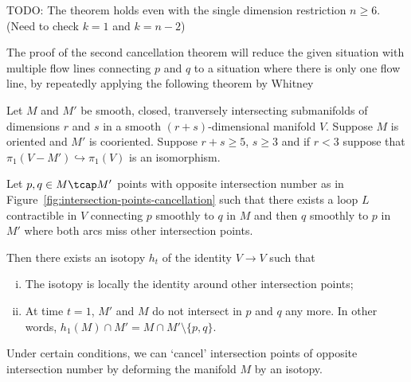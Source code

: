 \begin{remark}
    TODO: The theorem holds even with the single dimension restriction $ n \ge  6$. (Need to check $k = 1$ and $k = n-2$)
\end{remark}

The proof of the second cancellation theorem will reduce the given situation with multiple flow lines connecting $p$ and  $q$ to a situation where there is only one flow line, by repeatedly applying the following theorem by Whitney 
\begin{theorem}[Whitney]
    Let $M$ and  $M'$ be smooth, closed, tranversely intersecting submanifolds of dimensions  $r$ and $s$ in a smooth  $(r+s)$-dimensional manifold $V$.
    Suppose  $M$ is oriented and  $M'$ is cooriented.
    Suppose $r+s \ge 5$, $s\ge 3$ and if $r<3$ suppose that $\pi_1(V - M') \hookrightarrow \pi_1(V)$ is an isomorphism.

    Let $p, q \in  M \tcap M'$ points with opposite intersection number as in Figure~\ref{fig:intersection-points-cancellation} such that there exists a loop $L$ contractible in  $V$ connecting  $p$ smoothly to $q$ in  $M$  and then $q$ smoothly to  $p$ in $M'$ where both arcs miss other intersection points.

    Then there exists an isotopy $h_t$ of the identity $V \to V$ such that
    \begin{enumerate}[(i)]
        \item The isotopy is locally the identity around other intersection points;
        \item At time  $t = 1$,  $M'$ and  $M$ do not intersect in $p$ and $q$  any more.  In other words, $h_1(M) \cap M' = M \cap  M' \setminus \{ p, q\} $.
    \end{enumerate}
\end{theorem}
\begin{marginfigure}
    \centering
    \caption{
    Under certain conditions, we can `cancel' intersection points of opposite intersection number by deforming the manifold $M$ by an isotopy.}
    \label{fig:intersection-points-cancellation}
\end{marginfigure}
